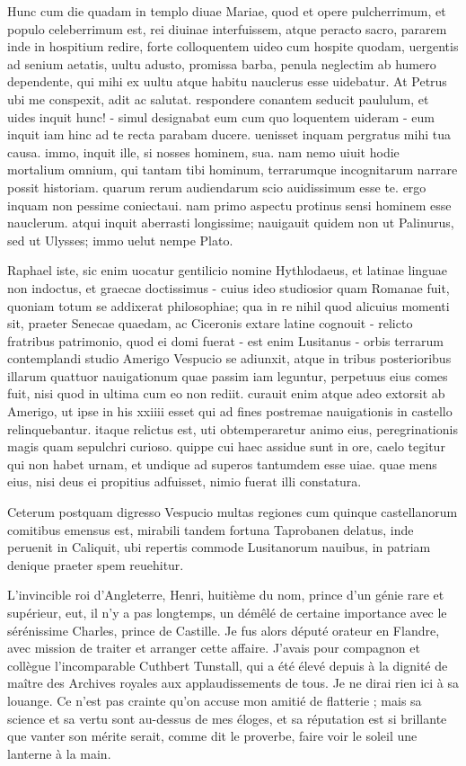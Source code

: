 \documentclass[12pt,a4paper]{article}
\begin{document}
Hunc cum die quadam in templo diuae Mariae, quod et opere pulcherrimum, et 
populo celeberrimum est, rei diuinae interfuissem, atque peracto sacro, pararem 
inde in hospitium redire, forte colloquentem uideo cum hospite quodam, uergentis 
ad senium aetatis, uultu adusto, promissa barba, penula neglectim ab humero 
dependente, qui mihi ex uultu atque habitu nauclerus esse uidebatur. 
At Petrus ubi me conspexit, adit ac salutat. respondere conantem seducit 
paululum, et uides inquit hunc! - simul designabat eum cum quo loquentem uideram 
- eum inquit iam hinc ad te recta parabam ducere. uenisset inquam pergratus mihi 
tua causa. immo, inquit ille, si nosses hominem, sua. nam nemo uiuit hodie 
mortalium omnium, qui tantam tibi hominum, terrarumque incognitarum narrare 
possit historiam. quarum rerum audiendarum scio auidissimum esse te. ergo inquam 
non pessime coniectaui. nam primo aspectu protinus sensi hominem esse nauclerum. 
atqui inquit aberrasti longissime; nauigauit quidem non ut Palinurus, sed ut 
Ulysses; immo uelut nempe Plato. 

Raphael iste, sic enim uocatur gentilicio 
nomine Hythlodaeus, et latinae linguae non indoctus, et graecae doctissimus - 
cuius ideo studiosior quam Romanae fuit, quoniam totum se addixerat 
philosophiae; qua in re nihil quod alicuius momenti sit, praeter Senecae 
quaedam, ac Ciceronis extare latine cognouit - relicto fratribus patrimonio, 
quod ei domi fuerat - est enim Lusitanus - orbis terrarum contemplandi studio 
Amerigo Vespucio se adiunxit, atque in tribus posterioribus illarum quattuor 
nauigationum quae passim iam leguntur, perpetuus eius comes fuit, nisi quod in 
ultima cum eo non rediit. curauit enim atque adeo extorsit ab Amerigo, ut ipse 
in his xxiiii esset qui ad fines postremae nauigationis in castello 
relinquebantur. itaque relictus est, uti obtemperaretur animo eius, 
peregrinationis magis quam sepulchri curioso. quippe cui haec assidue sunt in 
ore, caelo tegitur qui non habet urnam, et undique ad superos tantumdem esse 
uiae. quae mens eius, nisi deus ei propitius adfuisset, nimio fuerat illi 
constatura. 


Ceterum postquam digresso Vespucio multas regiones cum quinque castellanorum 
comitibus emensus est, mirabili tandem fortuna Taprobanen delatus, inde peruenit 
in Caliquit, ubi repertis commode Lusitanorum nauibus, in patriam denique 
praeter spem reuehitur. 


L'invincible roi d'Angleterre, Henri, huitième du nom, prince d'un génie rare et supérieur, eut, il n'y a pas longtemps, un démêlé de certaine importance avec le sérénissime Charles, prince de Castille. Je fus alors député orateur en Flandre, avec mission de traiter et arranger cette affaire. J'avais pour compagnon et collègue l'incomparable Cuthbert Tunstall, qui a été élevé depuis à la dignité de maître des Archives royales aux applaudissements de tous. Je ne dirai rien ici à sa louange. Ce n'est pas crainte qu'on accuse mon amitié de flatterie ; mais sa science et sa vertu sont au-dessus de mes éloges, et sa réputation est si brillante que vanter son mérite serait, comme dit le proverbe, faire voir le soleil une lanterne à la main.
\end{document}
